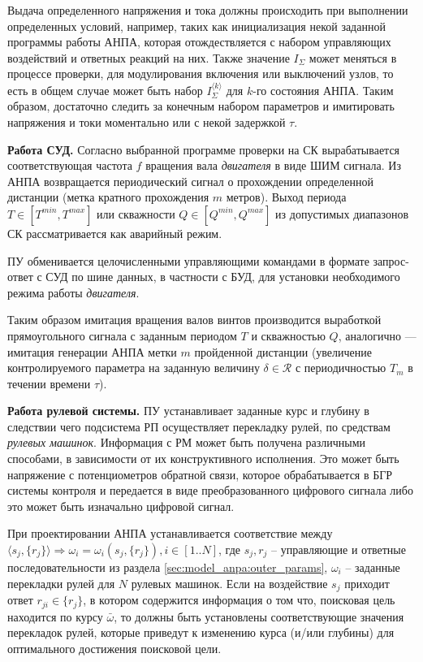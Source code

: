 Выдача определенного напряжения и тока должны происходить при выполнении определенных условий,
например, таких как инициализация некой заданной программы работы АНПА, которая
отождествляется с набором управляющих воздействий и ответных реакций на них.
Также значение $I_\Sigma$ может меняться в процессе проверки, для модулирования включения или выключений узлов,
то есть в общем случае может быть набор $I_\Sigma^{\langle k \rangle}$ для $k$-го состояния АНПА.
Таким образом, достаточно следить за конечным набором параметров и
имитировать напряжения и токи моментально или с некой задержкой $\tau$.

\textbf{Работа СУД.}
Согласно выбранной программе проверки на СК вырабатывается соответствующая 
частота $f$ вращения вала \textit{двигателя} в виде ШИМ сигнала.
Из АНПА возвращается периодический сигнал о прохождении определенной дистанции (метка кратного прохождения $m$ метров).
Выход периода $T \in [T^{min}, T^{max}]$ или скважности $Q \in [Q^{min}, Q^{max}]$ из допустимых диапазонов
СК рассматривается как аварийный режим.

ПУ обменивается целочисленными управляющими командами в формате запрос-ответ с СУД по шине данных, в частности с БУД,
для установки необходимого режима работы \textit{двигателя}.

Таким образом имитация вращения валов винтов производится выработкой прямоугольного сигнала с заданным периодом $T$ и скважностью $Q$,
аналогично --- имитация генерации АНПА метки $m$ пройденной дистанции
(увеличение контролируемого параметра на заданную величину $\delta \in \mathcal{R}$ с периодичностью $T_m$ в течении времени $\tau$).

\textbf{Работа рулевой системы.}
ПУ устанавливает заданные курс и глубину в следствии чего подсистема РП
осуществляет перекладку рулей, по средствам \textit{рулевых машинок}.
Информация с РМ может быть получена различными способами, в зависимости от их конструктивного исполнения.
Это может быть напряжение с потенциометров обратной связи, которое обрабатывается в БГР системы контроля
и передается в виде преобразованного цифрового сигнала
либо это может быть изначально  цифровой сигнал.

При проектировании АНПА устанавливается соответствие между $\langle s_j, \{r_j\} \rangle \Rightarrow \omega_i = \omega_i(s_j, \{r_j\}), i\in [1..N]$,
где $s_j, r_j$ -- управляющие и ответные последовательности из раздела \ref{sec:model_anpa:outer_params},
$\omega_i$ -- заданные перекладки рулей для $N$ рулевых машинок.
Если на воздействие $s_j$ приходит ответ $r_{ji} \in \{r_j\}$, в котором содержится информация о том что,
поисковая цель находится по курсу $\bar \omega$, то должны быть установлены соответствующие значения перекладок рулей,
которые приведут к изменению курса (и/или глубины) для оптимального достижения поисковой цели.


